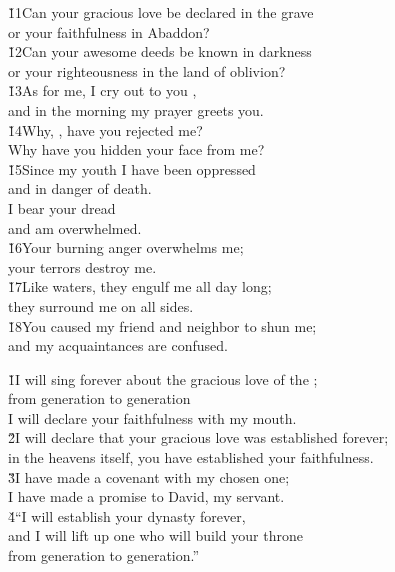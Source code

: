 \begin{poetry}
\poeml \v{11}Can your gracious love be declared in the grave \\
\poemll    or your faithfulness in Abaddon? \\
\poeml \v{12}Can your awesome deeds be known in darkness \\
\poemll    or your righteousness in the land of oblivion? \\
\poeml \v{13}As for me, I cry out to you , \\
\poemll    and in the morning my prayer greets you. \\
\poeml \v{14}Why, , have you rejected me? \\
\poemll    Why have you hidden your face from me? \\
\poeml \v{15}Since my youth I have been oppressed \\
\poemll    and in danger of death. \\
\poeml I bear your dread \\
\poemll    and am overwhelmed. \\
\poeml \v{16}Your burning anger overwhelms me; \\
\poemll    your terrors destroy me. \\
\poeml \v{17}Like waters, they engulf me all day long; \\
\poemll    they surround me on all sides. \\
\poeml \v{18}You caused my friend and neighbor to shun me; \\
\poemll    and my acquaintances are confused.
\end{poetry}

\begin{poetry}
\poeml \v{1}I will sing forever about the gracious love of the ; \\
\poemll    from generation to generation \\
\poemlll       I will declare your faithfulness with my mouth. \\
\poeml \v{2}I will declare that your gracious love was established forever; \\
\poemll    in the heavens itself, you have established your faithfulness. \\
\poeml \v{3}I have made a covenant with my chosen one; \\
\poemll    I have made a promise to David, my servant. \\
\poeml \v{4}``I will establish your dynasty forever, \\
\poemll    and I will lift up one who will build your throne \\
\poemlll       from generation to generation.''
\end{poetry}

